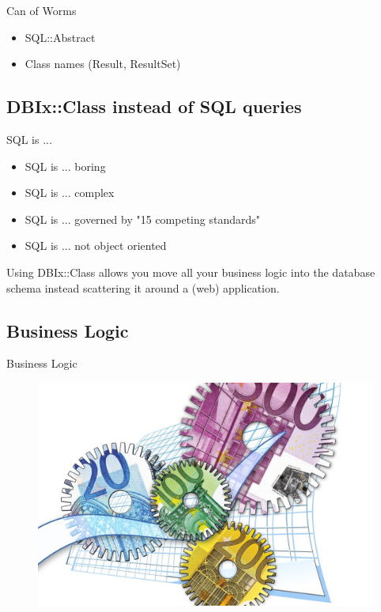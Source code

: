 \begin{frame}{Can of Worms}
\begin{itemize}
\item SQL::Abstract
\item Class names (Result, ResultSet)
\end{itemize}
\end{frame}

\subsection{DBIx::Class instead of SQL queries}

\begin{frame}{SQL is ...}
\begin{itemize}
\item SQL is ... boring
\item SQL is ... complex
\item SQL is ... governed by "15 competing standards"
\item SQL is ... not object oriented
\end{itemize}
\end{frame}


Using DBIx::Class allows you move all your business logic
into the database schema instead scattering it around a (web)
application.

\subsection{Business Logic}
\begin{frame}{Business Logic}
\begin{figure}[!ht]
\centering
\includegraphics[width=0.75\linewidth]{img/business-logic.jpg}
\end{figure}
\end{frame}

